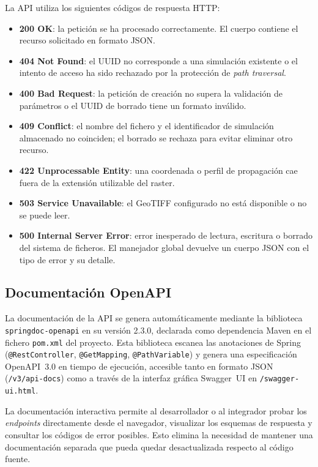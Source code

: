 La API utiliza los siguientes códigos de respuesta HTTP:

\begin{itemize}
  \item \textbf{200 OK}: la petición se ha procesado correctamente. El cuerpo contiene el
    recurso solicitado en formato JSON.
  \item \textbf{404 Not Found}: el UUID no corresponde a una simulación existente o el
    intento de acceso ha sido rechazado por la protección de \textit{path traversal}.
  \item \textbf{400 Bad Request}: la petición de creación no supera la validación de
    parámetros o el UUID de borrado tiene un formato inválido.
  \item \textbf{409 Conflict}: el nombre del fichero y el identificador de simulación
    almacenado no coinciden; el borrado se rechaza para evitar eliminar otro recurso.
  \item \textbf{422 Unprocessable Entity}: una coordenada o perfil de propagación cae fuera
    de la extensión utilizable del raster.
  \item \textbf{503 Service Unavailable}: el GeoTIFF configurado no está disponible o no
    se puede leer.
  \item \textbf{500 Internal Server Error}: error inesperado de lectura, escritura o
    borrado del sistema de ficheros. El manejador global devuelve un cuerpo JSON con el
    tipo de error y su detalle.
\end{itemize}

\subsection{Documentación OpenAPI}
\label{subsec:openapi}

La documentación de la API se genera automáticamente mediante la biblioteca
\lstinline{springdoc-openapi} en su versión 2.3.0, declarada como dependencia Maven en el
fichero \lstinline{pom.xml} del proyecto. Esta biblioteca escanea las anotaciones de Spring
(\lstinline{@RestController}, \lstinline{@GetMapping}, \lstinline{@PathVariable}) y genera
una especificación OpenAPI~3.0 en tiempo de ejecución, accesible tanto en formato JSON
(\lstinline{/v3/api-docs}) como a través de la interfaz gráfica Swagger~UI en
\lstinline{/swagger-ui.html}.

La documentación interactiva permite al desarrollador o al integrador probar los
\textit{endpoints} directamente desde el navegador, visualizar los esquemas de respuesta y
consultar los códigos de error posibles. Esto elimina la necesidad de mantener una
documentación separada que pueda quedar desactualizada respecto al código fuente.

